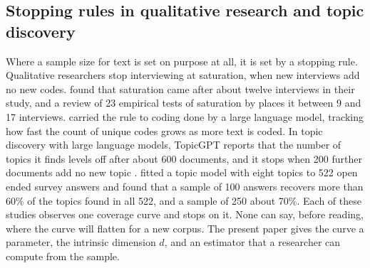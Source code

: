 \subsection{Stopping rules in qualitative research and topic discovery}

Where a sample size for text is set on purpose at all, it is set by a stopping rule. Qualitative researchers stop interviewing at saturation, when new interviews add no new codes. \citet{guest2006} found that saturation came after about twelve interviews in their study, and a review of 23 empirical tests of saturation by \citet{hennink2022} places it between 9 and 17 interviews. \citet{depaoli2024} carried the rule to coding done by a large language model, tracking how fast the count of unique codes grows as more text is coded. In topic discovery with large language models, TopicGPT reports that the number of topics it finds levels off after about 600 documents, and it stops when 200 further documents add no new topic \citep{pham2024topicgpt}. \citet{maeda2025} fitted a topic model with eight topics to 522 open ended survey answers and found that a sample of 100 answers recovers more than 60\% of the topics found in all 522, and a sample of 250 about 70\%. Each of these studies observes one coverage curve and stops on it. None can say, before reading, where the curve will flatten for a new corpus. The present paper gives the curve a parameter, the intrinsic dimension $d$, and an estimator that a researcher can compute from the sample.
